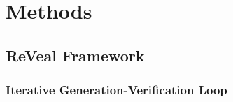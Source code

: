 \documentclass{article} %
\begin{document}



\section{Methods}
\label{sec:Approach}
\subsection{ReVeal Framework}
\subsubsection{Iterative Generation-Verification Loop}
\end{document}
